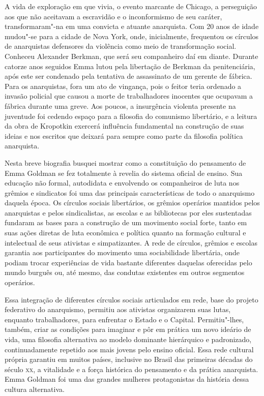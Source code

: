 A vida de exploração em que vivia, o evento marcante de Chicago, a
perseguição aos que não aceitavam a escravidão e o inconformismo de seu
caráter, transformaram"-na em uma convicta e atuante anarquista. Com
20 anos de idade mudou"-se para a cidade de Nova York, onde,
inicialmente, frequentou os círculos de anarquistas defensores da
violência como meio de transformação social. Conheceu Alexander
Berkman, que será seu companheiro daí em diante. Durante catorze anos 
seguidos Emma lutou pela libertação de Berkman da penitenciária, após
este ser condenado pela tentativa de assassinato de um gerente de
fábrica. Para os anarquistas, fora um ato de vingança, pois o
feitor teria ordenado a invasão policial que causou a morte de
trabalhadores inocentes que ocupavam a fábrica durante uma greve. Aos
poucos, a insurgência violenta presente na juventude foi cedendo espaço
para a filosofia do comunismo libertário, e a leitura da obra de
Kropotkin exercerá influência fundamental na construção de suas ideias 
e nos escritos que deixará para sempre como parte da filosofia política
anarquista.

Nesta breve biografia busquei mostrar como a constituição do pensamento
de Emma Goldman se fez totalmente à revelia do sistema oficial de
ensino. Sua educação não formal, autodidata e envolvendo os
companheiros de luta nos grêmios e sindicatos foi uma das principais
características de todo o anarquismo daquela época. Os círculos sociais
libertários, os grêmios operários mantidos pelos anarquistas e pelos
sindicalistas, as escolas e as bibliotecas por eles sustentadas
fundaram as bases para a construção de um movimento social forte, tanto em
suas ações diretas de luta econômica e política quanto na
formação cultural e intelectual de seus ativistas e simpatizantes. A
rede de círculos, grêmios e escolas garantia aos participantes do
movimento uma sociabilidade libertária, onde podiam trocar experiências
de vida bastante diferentes daquelas oferecidas pelo mundo burguês ou,
até mesmo, das condutas existentes em outros segmentos operários. 

Essa integração de diferentes círculos sociais articulados em rede, base
do projeto federativo do anarquismo, permitiu aos ativistas 
organizarem suas lutas, enquanto trabalhadores, para enfrentar o
Estado e o Capital. Permitiu"-lhes, também, criar as condições para
imaginar e pôr em prática um novo ideário de vida, uma filosofia
alternativa ao modelo dominante hierárquico e padronizado,
continuadamente repetido aos mais jovens pelo ensino oficial. Essa rede
cultural própria garantiu em muitos países, inclusive no Brasil das
primeiras décadas do século \textsc{xx}, a vitalidade e a força histórica do
pensamento e da prática anarquista. Emma Goldman foi uma das grandes
mulheres protagonistas da história dessa cultura alternativa.

